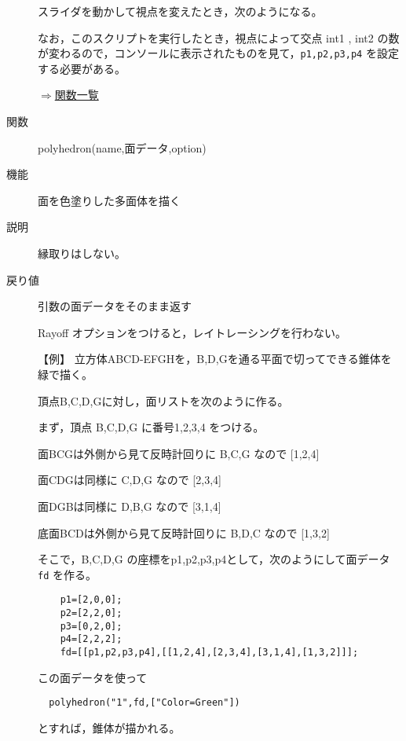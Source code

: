\documentclass[papersize,a4paper,12pt,uplatex]{jsarticle}
\begin{document}
\begin{description}
スライダを動かして視点を変えたとき，次のようになる。

  \hspace{10mm}  
 
 なお，このスクリプトを実行したとき，視点によって交点 int1 , int2 の数が変わるので，コンソールに表示されたものを見て，\verb|p1,p2,p3,p4| を設定する必要がある。
 
\begin{flushright} \hyperlink{functionlist}{$\Rightarrow$関数一覧}\end{flushright}

\hypertarget{polyhedron}{}
\item[関数] polyhedron(name,面データ,option)
\item[機能] 面を色塗りした多面体を描く
\item[説明] 縁取りはしない。
\item[戻り値] 引数の面データをそのまま返す

 Rayoff オプションをつけると，レイトレーシングを行わない。
 
\vspace{\baselineskip}
 【例】 立方体ABCD-EFGHを，B,D,Gを通る平面で切ってできる錐体を緑で描く。 

\hspace{30mm} 

   頂点B,C,D,Gに対し，面リストを次のように作る。 
   
   まず，頂点 B,C,D,G  に番号1,2,3,4 をつける。 
   
   面BCGは外側から見て反時計回りに B,C,G なので [1,2,4] 
   
   面CDGは同様に C,D,G なので [2,3,4] 
   
   面DGBは同様に D,B,G なので [3,1,4] 
   
   底面BCDは外側から見て反時計回りに B,D,C なので [1,3,2] 
   
   そこで，B,C,D,G の座標をp1,p2,p3,p4として，次のようにして面データ \verb|fd| を作る。 
\begin{verbatim}
    p1=[2,0,0]; 
    p2=[2,2,0]; 
    p3=[0,2,0]; 
    p4=[2,2,2]; 
    fd=[[p1,p2,p3,p4],[[1,2,4],[2,3,4],[3,1,4],[1,3,2]]];
\end{verbatim}

この面データを使って

 \verb|  polyhedron("1",fd,["Color=Green"])|

とすれば，錐体が描かれる。
    
\hspace{30mm} 


\end{description}
\end{document}
